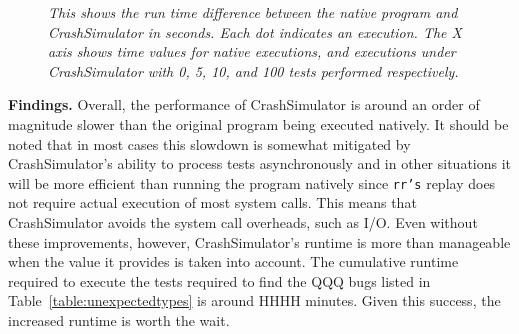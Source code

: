     \begin{figure}[t]
        \center{}
        \caption{\emph{This shows the run time difference between the
native program and CrashSimulator in seconds.  Each dot indicates an
        execution.  The X axis shows time values for native executions, and
        executions under CrashSimulator with 0, 5, 10, and 100 tests
        performed respectively.
}}
         \label{figure:performance}

    \end{figure}


{\bf Findings.}
Overall, the performance of CrashSimulator is around
an order of magnitude slower than the original program being executed
natively.  It should be noted that in most cases
this slowdown is somewhat mitigated by CrashSimulator's ability to process
tests asynchronously and in other situations it will be more efficient than
running the program natively since {\tt rr's} replay does not require
actual execution of most system calls.  This means that CrashSimulator
avoids the system call overheads, such as I/O.
Even without these improvements, however, CrashSimulator's runtime is more
than manageable when the value it provides is taken into account.  The
cumulative runtime required to execute the tests required to find the QQQ
bugs listed in Table~\ref{table:unexpectedtypes} is around HHHH minutes.
Given this success, the increased runtime is worth the wait.

